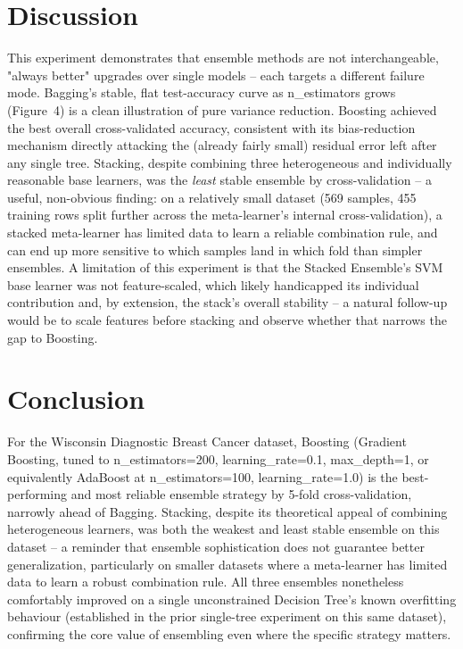 \documentclass[12pt,a4paper]{article}
\begin{document}
\section{Discussion}
This experiment demonstrates that ensemble methods are not interchangeable, "always better"
upgrades over single models -- each targets a different failure mode. Bagging's stable,
flat test-accuracy curve as n\_estimators grows (Figure~4) is a clean illustration of pure
variance reduction. Boosting achieved the best overall cross-validated accuracy, consistent
with its bias-reduction mechanism directly attacking the (already fairly small) residual
error left after any single tree. Stacking, despite combining three heterogeneous and
individually reasonable base learners, was the \emph{least} stable ensemble by cross-validation
-- a useful, non-obvious finding: on a relatively small dataset (569 samples, 455 training
rows split further across the meta-learner's internal cross-validation), a stacked
meta-learner has limited data to learn a reliable combination rule, and can end up more
sensitive to which samples land in which fold than simpler ensembles. A limitation of this
experiment is that the Stacked Ensemble's SVM base learner was not feature-scaled, which
likely handicapped its individual contribution and, by extension, the stack's overall
stability -- a natural follow-up would be to scale features before stacking and observe
whether that narrows the gap to Boosting.

\section{Conclusion}
For the Wisconsin Diagnostic Breast Cancer dataset, Boosting (Gradient Boosting, tuned to
n\_estimators=200, learning\_rate=0.1, max\_depth=1, or equivalently AdaBoost at
n\_estimators=100, learning\_rate=1.0) is the best-performing and most reliable ensemble
strategy by 5-fold cross-validation, narrowly ahead of Bagging. Stacking, despite its
theoretical appeal of combining heterogeneous learners, was both the weakest and least stable
ensemble on this dataset -- a reminder that ensemble sophistication does not guarantee better
generalization, particularly on smaller datasets where a meta-learner has limited data to
learn a robust combination rule. All three ensembles nonetheless comfortably improved on a
single unconstrained Decision Tree's known overfitting behaviour (established in the prior
single-tree experiment on this same dataset), confirming the core value of ensembling even
where the specific strategy matters.
\end{document}
